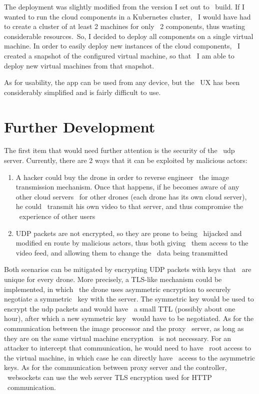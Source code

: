 The deployment was slightly modified from the version I set out to \
build.
If I wanted to run the cloud components in a Kubernetes cluster, \
I would have had to create a cluster of at least 2 machines for only \
2 components, thus wasting considerable resources.\
So, I decided to deploy all components on a single virtual machine.
In order to easily deploy new instances of the cloud components, \
I created a snapshot of the configured virtual machine, so that \
I am able to deploy new virtual machines from that snapshot.

As for usability, the app can be used from any device, but the \
UX has been considerably simplified and is fairly difficult to use.



\section{Further Development}
\label{sec:conclusions-further-development}
The first item that would need further attention is the security of the \
udp server.
Currently, there are 2 ways that it can be exploited by malicious actors:
\begin{enumerate}
    \item A hacker could buy the drone in order to reverse engineer \
        the image transmission mechanism.
        Once that happens, if he becomes aware of any other cloud servers \
        for other drones (each drone has its own cloud server), he could \
        transmit his own video to that server, and thus compromise the \
        experience of other users
    \item UDP packets are not encrypted, so they are prone to being \
        hijacked and modified en route by malicious actors, thus both giving \
        them access to the video feed, and allowing them to change the \
        data being transmitted
\end{enumerate}

Both scenarios can be mitigated by encrypting UDP packets with keys that \
are unique for every drone.
More precisely, a TLS-like mechanism could be implemented, in which \
the drone uses asymmetric encryption to securely negotiate a symmetric \
key with the server.
The symmetric key would be used to encrypt the udp packets and would have \
a small TTL (possibly about one hour), after which a new symmetric key \
would have to be negotiated.
As for the communication between the image processor and the proxy \
server, as long as they are on the same virtual machine encryption \
is not necessary.
For an attacker to intercept that communication, he would need to have \
root access to the virtual machine, in which case he can directly have \
access to the asymmetric keys.
As for the communication between proxy server and the controller, \
websockets can use the web server TLS encryption used for HTTP \
communication.

